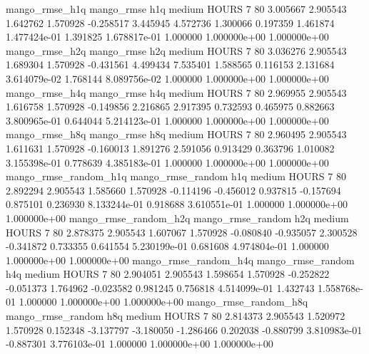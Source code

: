        mango_rmse_h1q        mango_rmse                  h1q     medium    HOURS                 7 80  3.005667       2.905543 1.642762       1.570928   -0.258517      3.445945      4.572736     1.300066       0.197359  1.461874 1.477424e-01     1.391825   1.678817e-01            1.000000    1.000000e+00        1.000000e+00
       mango_rmse_h2q        mango_rmse                  h2q     medium    HOURS                 7 80  3.036276       2.905543 1.689304       1.570928   -0.431561      4.499434      7.535401     1.588565       0.116153  2.131684 3.614079e-02     1.768144   8.089756e-02            1.000000    1.000000e+00        1.000000e+00
       mango_rmse_h4q        mango_rmse                  h4q     medium    HOURS                 7 80  2.969955       2.905543 1.616758       1.570928   -0.149856      2.216865      2.917395     0.732593       0.465975  0.882663 3.800965e-01     0.644044   5.214123e-01            1.000000    1.000000e+00        1.000000e+00
       mango_rmse_h8q        mango_rmse                  h8q     medium    HOURS                 7 80  2.960495       2.905543 1.611631       1.570928   -0.160013      1.891276      2.591056     0.913429       0.363796  1.010082 3.155398e-01     0.778639   4.385183e-01            1.000000    1.000000e+00        1.000000e+00
mango_rmse_random_h1q mango_rmse_random                  h1q     medium    HOURS                 7 80  2.892294       2.905543 1.585660       1.570928   -0.114196     -0.456012      0.937815    -0.157694       0.875101  0.236930 8.133244e-01     0.918688   3.610551e-01            1.000000    1.000000e+00        1.000000e+00
mango_rmse_random_h2q mango_rmse_random                  h2q     medium    HOURS                 7 80  2.878375       2.905543 1.607067       1.570928   -0.080840     -0.935057      2.300528    -0.341872       0.733355  0.641554 5.230199e-01     0.681608   4.974804e-01            1.000000    1.000000e+00        1.000000e+00
mango_rmse_random_h4q mango_rmse_random                  h4q     medium    HOURS                 7 80  2.904051       2.905543 1.598654       1.570928   -0.252822     -0.051373      1.764962    -0.023582       0.981245  0.756818 4.514099e-01     1.432743   1.558768e-01            1.000000    1.000000e+00        1.000000e+00
mango_rmse_random_h8q mango_rmse_random                  h8q     medium    HOURS                 7 80  2.814373       2.905543 1.520972       1.570928    0.152348     -3.137797     -3.180050    -1.286466       0.202038 -0.880799 3.810983e-01    -0.887301   3.776103e-01            1.000000    1.000000e+00        1.000000e+00
